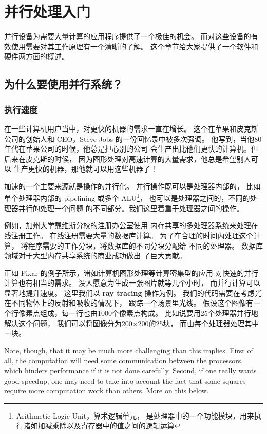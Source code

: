 \chapter{并行处理入门}
\label{chap:intro}

并行设备为需要大量计算的应用程序提供了一个极佳的机会。
而对这些设备的有效使用需要对其工作原理有一个清晰的了解。
这个章节给大家提供了一个软件和硬件两方面的概述。

\section{为什么要使用并行系统？}

\subsection{执行速度}

在一些计算机用户当中，对更快的机器的需求一直在增长。
这个在苹果和皮克斯公司的创始人和 CEO，Steve Jobs 的一份回忆录中被多次强调。
他写到，当他80年代在苹果公司的时候，他总是担心别的公司
会生产出比他们更快的计算机。但后来在皮克斯的时候，
因为图形处理对高速计算的大量需求，他总是希望别人可以
生产更快的机器，那他就可以用这些机器了！

加速的一个主要来源就是操作的并行化。
并行操作既可以是处理器内部的，
比如单个处理器内部的 pipelining 或多个 ALU\footnote{Arithmetic Logic Unit，算术逻辑单元，
是处理器中的一个功能模块，用来执行诸如加减乘除以及寄存器中的值之间的逻辑运算}，
也可以是处理器之间的，不同的处理器并行的处理一个问题
的不同部分。我们这里着重于处理器之间的操作。

例如，加州大学戴维斯分校的注册办公室使用
内存共享的多处理器系统来处理在线注册工作。
在线注册需要大量的数据库计算。
为了在合理的时间内处理这个计算，
将程序需要的工作分块，将数据库的不同分块分配给
不同的处理器。
数据库领域对于大型内存共享系统的商业成功做出
了巨大贡献。

正如 Pixar 的例子所示，诸如计算机图形处理等计算密集型的应用
对快速的并行计算也有相当的需求。
没人愿意为生成一张图片就等几个小时，
而并行计算可以显著地提升速度。
这里我们以 \textbf{ray tracing} 操作为例。
我们的代码需要在考虑光在不同物体上的反射和吸收的情况下，
跟踪一个场景里光线。
假设这个图像有一个行像素点组成，每一行也由1000个像素点构成。
比如说要用25个处理器并行地解决这个问题，
我们可以将图像分为200$\times$200的25块，
而由每个处理器处理其中一块。

Note, though, that it may be much more challenging than this implies.
First of all, the computation will need some communication between the
processors, which hinders performance if it is not done carefully.
Second, if one really wants good speedup, one may need to take into
account the fact that some squares require more computation work than
others.  More on this below.

